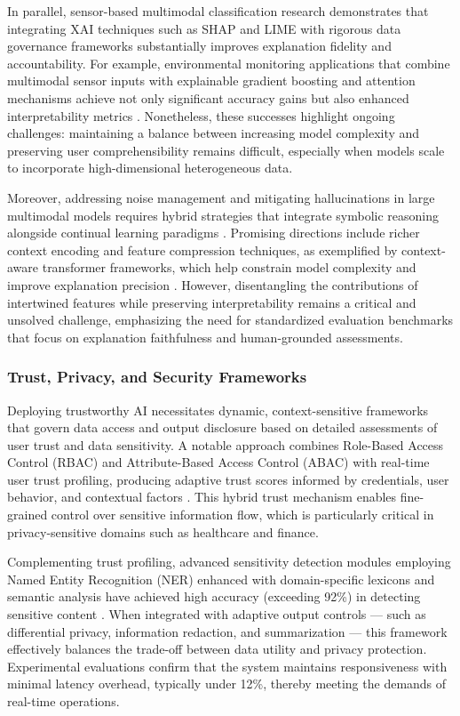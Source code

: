 \documentclass[sigconf]{acmart}
\begin{document}
In parallel, sensor-based multimodal classification research demonstrates that integrating XAI techniques such as SHAP and LIME with rigorous data governance frameworks substantially improves explanation fidelity and accountability. For example, environmental monitoring applications that combine multimodal sensor inputs with explainable gradient boosting and attention mechanisms achieve not only significant accuracy gains but also enhanced interpretability metrics \cite{ref25}. Nonetheless, these successes highlight ongoing challenges: maintaining a balance between increasing model complexity and preserving user comprehensibility remains difficult, especially when models scale to incorporate high-dimensional heterogeneous data.

Moreover, addressing noise management and mitigating hallucinations in large multimodal models requires hybrid strategies that integrate symbolic reasoning alongside continual learning paradigms \cite{ref13,ref24,ref25}. Promising directions include richer context encoding and feature compression techniques, as exemplified by context-aware transformer frameworks, which help constrain model complexity and improve explanation precision \cite{ref17}. However, disentangling the contributions of intertwined features while preserving interpretability remains a critical and unsolved challenge, emphasizing the need for standardized evaluation benchmarks that focus on explanation faithfulness and human-grounded assessments.

\subsubsection{Trust, Privacy, and Security Frameworks}

Deploying trustworthy AI necessitates dynamic, context-sensitive frameworks that govern data access and output disclosure based on detailed assessments of user trust and data sensitivity. A notable approach combines Role-Based Access Control (RBAC) and Attribute-Based Access Control (ABAC) with real-time user trust profiling, producing adaptive trust scores informed by credentials, user behavior, and contextual factors \cite{ref11}. This hybrid trust mechanism enables fine-grained control over sensitive information flow, which is particularly critical in privacy-sensitive domains such as healthcare and finance.

Complementing trust profiling, advanced sensitivity detection modules employing Named Entity Recognition (NER) enhanced with domain-specific lexicons and semantic analysis have achieved high accuracy (exceeding 92\%) in detecting sensitive content \cite{ref11}. When integrated with adaptive output controls — such as differential privacy, information redaction, and summarization — this framework effectively balances the trade-off between data utility and privacy protection. Experimental evaluations confirm that the system maintains responsiveness with minimal latency overhead, typically under 12\%, thereby meeting the demands of real-time operations.
\end{document}
